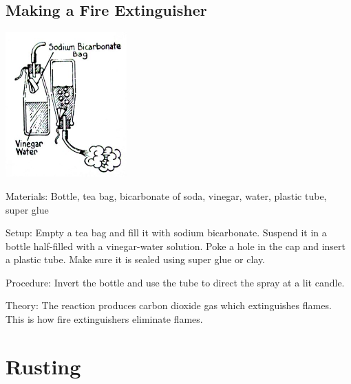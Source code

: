 \begin{multicols}{2}
\vfill
\columnbreak

\subsection{Making a Fire Extinguisher}

\begin{center}
\includegraphics[width=0.35\textwidth]{./img/fire-extinguisher.jpg}
\end{center}

\begin{description*}
\item[Materials:]{Bottle, tea bag, bicarbonate of soda, vinegar, water, plastic tube, super glue}
\item[Setup:]{Empty a tea bag and fill it with sodium bicarbonate. Suspend it in a bottle half-filled with a vinegar-water solution. Poke a hole in the cap and insert a plastic tube. Make sure it is sealed using super glue or clay.}
\item[Procedure:]{Invert the bottle and use the tube to direct the spray at a lit candle.}
\item[Theory:]{The reaction produces carbon dioxide gas which extinguishes flames. This is how fire extinguishers eliminate flames.}
\end{description*}

\vfill
\columnbreak


\section*{Rusting}



\end{multicols}
